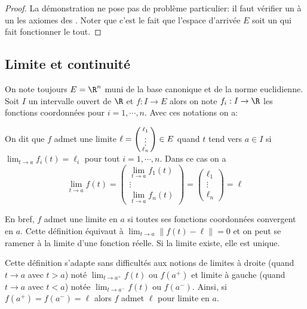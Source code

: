 \begin{proof}
    La démonstration ne pose pas de problème particulier: il faut vérifier un à un les axiomes des \rev. Noter que c'est le fait que l'espace d'arrivée $E$ soit un \rev{} qui fait fonctionner le tout.
\end{proof}


\subsection{Limite et continuité}

On note toujours $E=\R^n$ muni de la base canonique et de la norme euclidienne. Soit $I$ un intervalle ouvert de $\R$ et $f:I\to E$ alors on note $f_i: I \to \R$ les fonctions coordonnées pour $i=1,\cdots,n$. Avec ces notations on a:
\begin{definition}[(limite)]
	On dit que $f$ admet une limite $\ell = \begin{psmallmatrix}\ell_1\\\vdots\\\ell_n\end{psmallmatrix}\in E$ quand $t$ tend vers $a\in I$ si $\lim_{t\to a}\limits  f_i(t) = \ell_i$ pour tout $i=1,\cdots,n$. Dans ce cas on a
	\[
		\lim_{t\to a} f(t) = \begin{pmatrix}\lim_{t\to a}\limits f_1(t) \\ \vdots \\ \lim_{t\to a}\limits f_n(t)\end{pmatrix} = \begin{pmatrix}\ell_1\\ \vdots \\ \ell_n\end{pmatrix} = \ell
	\]
\end{definition}
En bref, $f$ admet une limite en $a$ si toutes ses fonctions coordonnées convergent en $a$. Cette définition équivaut à $\lim_{t\to a} \limits \| f(t) - \ell\| =0 $ et on peut se ramener à la limite d'une fonction réelle. Si la limite existe, elle est unique.

\pl{\rep{4cm}}


\begin{remark}
	Cette définition s'adapte sans difficultés aux notions de limites à droite (\ie quand $t\to a$ avec $t>a$) noté $\lim_{t\to a^+} \limits f(t) $ ou $f(a^+)$ et limite à gauche  (\ie quand $t\to a$ avec $t<a$) notée $\lim_{t\to a^-}\limits  f (t)$ ou $f(a^-)$. Ainsi, si $f(a^+) = f(a^-) = \ell$ alors $f$ admet $\ell$ pour limite en $a$. 
\end{remark}

